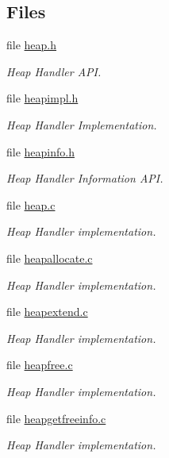 \subsection*{Files}
\begin{DoxyCompactItemize}
\item 
file \mbox{\hyperlink{heap_8h}{heap.\+h}}
\begin{DoxyCompactList}\small\item\em Heap Handler A\+PI. \end{DoxyCompactList}\item 
file \mbox{\hyperlink{heapimpl_8h}{heapimpl.\+h}}
\begin{DoxyCompactList}\small\item\em Heap Handler Implementation. \end{DoxyCompactList}\item 
file \mbox{\hyperlink{heapinfo_8h}{heapinfo.\+h}}
\begin{DoxyCompactList}\small\item\em Heap Handler Information A\+PI. \end{DoxyCompactList}\item 
file \mbox{\hyperlink{heap_8c}{heap.\+c}}
\begin{DoxyCompactList}\small\item\em Heap Handler implementation. \end{DoxyCompactList}\item 
file \mbox{\hyperlink{heapallocate_8c}{heapallocate.\+c}}
\begin{DoxyCompactList}\small\item\em Heap Handler implementation. \end{DoxyCompactList}\item 
file \mbox{\hyperlink{heapextend_8c}{heapextend.\+c}}
\begin{DoxyCompactList}\small\item\em Heap Handler implementation. \end{DoxyCompactList}\item 
file \mbox{\hyperlink{heapfree_8c}{heapfree.\+c}}
\begin{DoxyCompactList}\small\item\em Heap Handler implementation. \end{DoxyCompactList}\item 
file \mbox{\hyperlink{heapgetfreeinfo_8c}{heapgetfreeinfo.\+c}}
\begin{DoxyCompactList}\small\item\em Heap Handler implementation. \end{DoxyCompactList}\item 

\end{DoxyCompactItemize}
